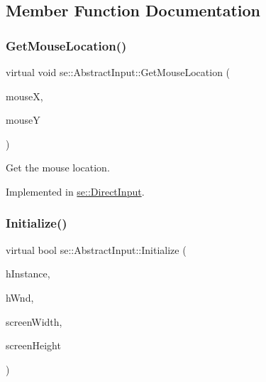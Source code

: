 \subsection{Member Function Documentation}
\mbox{\label{classse_1_1_abstract_input_a93673fb3534be8bbc1f495f650064b91}} 
\subsubsection{\texorpdfstring{Get\+Mouse\+Location()}{GetMouseLocation()}}
{\footnotesize\ttfamily virtual void se\+::\+Abstract\+Input\+::\+Get\+Mouse\+Location (\begin{DoxyParamCaption}\item[{int \&}]{mouseX,  }\item[{int \&}]{mouseY }\end{DoxyParamCaption})\hspace{0.3cm}{\ttfamily [pure virtual]}}

Get the mouse location. 

Implemented in \mbox{\hyperlink{classse_1_1_direct_input_a3c097a463a36421a13bf05819c4b681e}{se\+::\+Direct\+Input}}.

\mbox{\label{classse_1_1_abstract_input_a6219cdd66247d08f3ca52b2fea305b8d}} 
\subsubsection{\texorpdfstring{Initialize()}{Initialize()}}
{\footnotesize\ttfamily virtual bool se\+::\+Abstract\+Input\+::\+Initialize (\begin{DoxyParamCaption}\item[{H\+I\+N\+S\+T\+A\+N\+CE}]{h\+Instance,  }\item[{H\+W\+ND}]{h\+Wnd,  }\item[{int}]{screen\+Width,  }\item[{int}]{screen\+Height }\end{DoxyParamCaption})\hspace{0.3cm}{\ttfamily [pure virtual]}}

